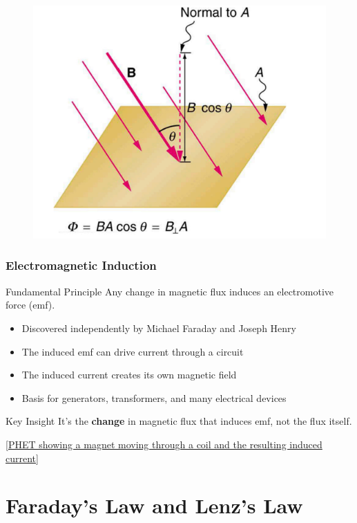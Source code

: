 \documentclass{beamer}
\begin{document}
\begin{frame}
\begin{figure}
    \centering
    \includegraphics[width=0.8\linewidth]{phys12-magnetism-magnetic-field-angle.png}
\end{figure}

\end{frame}

\begin{frame}
\frametitle{Electromagnetic Induction}
\begin{block}{Fundamental Principle}
Any change in magnetic flux induces an electromotive force (emf).
\end{block}

\begin{itemize}
\item Discovered independently by Michael Faraday and Joseph Henry
\item The induced emf can drive current through a circuit
\item The induced current creates its own magnetic field
\item Basis for generators, transformers, and many electrical devices
\end{itemize}

\begin{alertblock}{Key Insight}
It's the \textbf{change} in magnetic flux that induces emf, not the flux itself.
\end{alertblock}

\alert{[\href{https://phet.colorado.edu/en/simulations/faraday}{PHET showing a magnet moving through a coil and the resulting induced current}]}
\end{frame}

\section{Faraday's Law and Lenz's Law}
\end{document}
